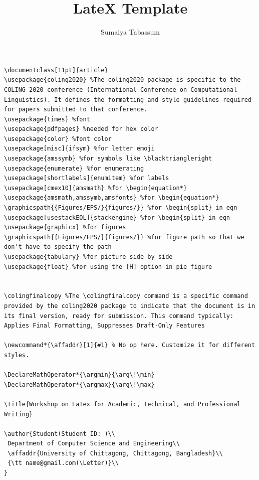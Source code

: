\documentclass{article}
\title{LateX Template}
\author{Sumaiya Tabassum}
\begin{document}
	\maketitle
\begin{lstlisting}
\documentclass[11pt]{article}
\usepackage{coling2020} %The coling2020 package is specific to the COLING 2020 conference (International Conference on Computational Linguistics). It defines the formatting and style guidelines required for papers submitted to that conference.
\usepackage{times} %font
\usepackage{pdfpages} %needed for hex color
\usepackage{color} %font color
\usepackage[misc]{ifsym} %for letter emoji
\usepackage{amssymb} %for symbols like \blacktriangleright
\usepackage{enumerate} %for enumerating
\usepackage[shortlabels]{enumitem} %for labels
\usepackage[cmex10]{amsmath} %for \begin{equation*}
\usepackage{amsmath,amssymb,amsfonts} %for \begin{equation*}
\graphicspath{{Figures/EPS/}{figures/}} %for \begin{split} in eqn
\usepackage[usestackEOL]{stackengine} %for \begin{split} in eqn
\usepackage{graphicx} %for figures
\graphicspath{{Figures/EPS/}{figures/}} %for figure path so that we don't have to specify the path
\usepackage{tabulary} %for picture side by side
\usepackage{float} %for using the [H] option in pie figure


\colingfinalcopy %The \colingfinalcopy command is a specific command provided by the coling2020 package to indicate that the document is in its final version, ready for submission. This command typically: Applies Final Formatting, Suppresses Draft-Only Features

\newcommand*{\affaddr}[1]{#1} % No op here. Customize it for different styles.

\DeclareMathOperator*{\argmin}{\arg\!\min} 
\DeclareMathOperator*{\argmax}{\arg\!\max}

\title{Workshop on LaTex for Academic, Technical, and Professional Writing}

\author{Student(Student ID: )\\
 Department of Computer Science and Engineering\\
 \affaddr{University of Chittagong, Chittagong, Bangladesh}\\
 {\tt name@gmail.com(\Letter)}\\
}


\end{lstlisting}
\end{document}

